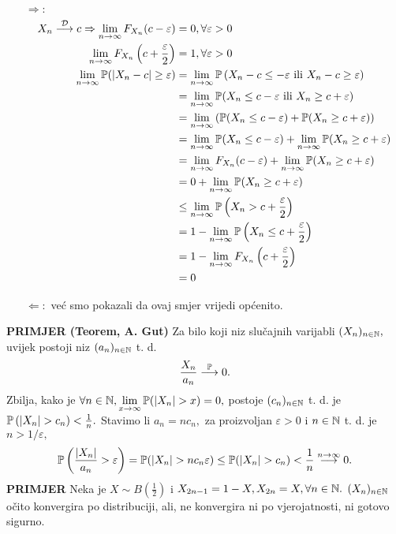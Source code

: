 \documentclass{article}
\begin{document}
\begin{itemize}
    \item[\(\boxed{\Rightarrow}:\)] \[\begin{aligned}X_n\overset{\mathcal D}{\longrightarrow}c\Rightarrow \lim_{n\to\infty}F_{X_n}(c-\varepsilon)&=0,\forall\varepsilon>0\\\lim_{n\to\infty}F_{X_n}\left(c+\frac\varepsilon2\right)&=1,\forall\varepsilon>0\\\lim_{n\to\infty}\Bbb P(|X_n-c|\ge\varepsilon)&=\lim_{n\to\infty}\Bbb P\left(X_n-c\le-\varepsilon\text{ ili }X_n-c\ge\varepsilon\right)\\&=\lim_{n\to\infty}\Bbb P(X_n\le c-\varepsilon\text{ ili }X_n\ge c+\varepsilon)\\&=\lim_{n\to\infty}\left(\Bbb P(X_n\le c-\varepsilon)+\Bbb P(X_n\ge c+\varepsilon)\right)\\&=\lim_{n\to\infty}\Bbb P(X_n\le c-\varepsilon)+\lim_{n\to\infty}\Bbb P(X_n\ge c+\varepsilon)\\&=\lim_{n\to\infty}F_{X_n}(c-\varepsilon)+\lim_{n\to\infty}\Bbb P(X_n\ge c+\varepsilon)\\&=0+\lim_{n\to\infty}\Bbb P(X_n\ge c+\varepsilon)\\&\le\lim_{n\to\infty}\Bbb P\left(X_n> c+\frac\varepsilon2\right)\\&=1-\lim_{n\to\infty}\Bbb P\left(X_n\le c+\frac\varepsilon2\right)\\&=1-\lim_{n\to\infty}F_{X_n}\left(c+\frac\varepsilon2\right)\\&=0\end{aligned}\] 
    \item[\(\boxed{\Leftarrow}:\)] već smo pokazali da ovaj smjer vrijedi općenito.
\end{itemize}
\textbf{PRIMJER (Teorem, A. Gut)}\newline
Za bilo koji niz slučajnih varijabli \((X_n)_{n\in\Bbb N},\) uvijek postoji niz \((a_n)_{n\in\Bbb N}\) t. d. \[\frac{X_n}{a_n}\overset{\Bbb P}{\longrightarrow}0.\] Zbilja, kako je \(\forall n\in\Bbb N,\lim\limits_{x\to\infty}\Bbb P(|X_n|>x)=0,\) postoje \((c_n)_{n\in\Bbb N}\) t. d. je \(\Bbb P\left(|X_n|>c_n\right)<\frac1n.\) Stavimo li \(a_n=nc_n,\) za proizvoljan \(\varepsilon>0\) i \(n\in\Bbb N\) t. d. je \(n>1/\varepsilon,\) \[\Bbb P\left(\frac{|X_n|}{a_n}>\varepsilon\right)=\Bbb P(|X_n|>nc_n\varepsilon)\le\Bbb P(|X_n|>c_n)<\frac1n\overset{n\to\infty}{\longrightarrow}0.\]
\textbf{PRIMJER}\newline
Neka je \(X\sim B\left(\frac12\right)\) i \(X_{2n-1}=1-X,X_{2n}=X,\forall n\in\Bbb N.\) \((X_n)_{n\in\Bbb N}\) očito konvergira po distribuciji, ali, ne konvergira ni po vjerojatnosti, ni gotovo sigurno.\newline\newline
\end{document}
